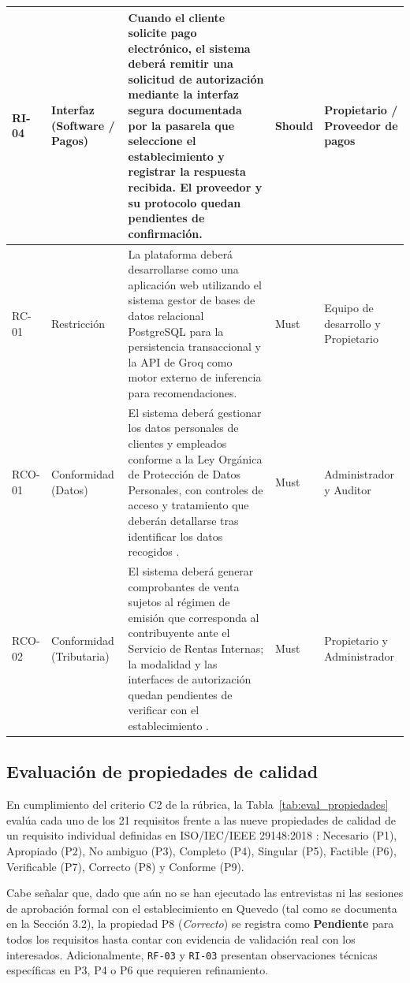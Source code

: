 \documentclass[onecolumn,12pt,a4paper]{IEEEtran}
\begin{document}
\begin{longtable}{>{\raggedright\arraybackslash}p{1.4cm} >{\raggedright\arraybackslash}p{2.3cm} >{\raggedright\arraybackslash}p{7.6cm} >{\raggedright\arraybackslash}p{1.6cm} >{\raggedright\arraybackslash}p{2.3cm}}
        \midrule
        RI-04 & Interfaz (Software / Pagos) & Cuando el cliente solicite pago electr\'onico, el sistema deber\'a remitir una solicitud de autorizaci\'on mediante la interfaz segura documentada por la pasarela que seleccione el establecimiento y registrar la respuesta recibida. El proveedor y su protocolo quedan pendientes de confirmaci\'on. & Should & Propietario / Proveedor de pagos \\
		\midrule
		RC-01 & Restricci\'on & La plataforma deber\'a desarrollarse como una aplicaci\'on web utilizando el sistema gestor de bases de datos relacional PostgreSQL para la persistencia transaccional y la API de Groq como motor externo de inferencia para recomendaciones. & Must & Equipo de desarrollo y Propietario \\
		\midrule
		RCO-01 & Conformidad (Datos) & El sistema deber\'a gestionar los datos personales de clientes y empleados conforme a la Ley Org\'anica de Protecci\'on de Datos Personales, con controles de acceso y tratamiento que deber\'an detallarse tras identificar los datos recogidos \cite{ecuador_lopdp2021}. & Must & Administrador y Auditor \\
        \midrule
        RCO-02 & Conformidad (Tributaria) & El sistema deber\'a generar comprobantes de venta sujetos al r\'egimen de emisi\'on que corresponda al contribuyente ante el Servicio de Rentas Internas; la modalidad y las interfaces de autorizaci\'on quedan pendientes de verificar con el establecimiento \cite{sri_comprobantes}. & Must & Propietario y Administrador \\
	\end{longtable}

	\subsection{Evaluaci\'on de propiedades de calidad}

	En cumplimiento del criterio C2 de la r\'ubrica, la Tabla~\ref{tab:eval_propiedades} eval\'ua cada uno de los 21 requisitos frente a las nueve propiedades de calidad de un requisito individual definidas en ISO/IEC/IEEE 29148:2018 \cite{iso29148}: Necesario (P1), Apropiado (P2), No ambiguo (P3), Completo (P4), Singular (P5), Factible (P6), Verificable (P7), Correcto (P8) y Conforme (P9).

	Cabe se\~nalar que, dado que a\'un no se han ejecutado las entrevistas ni las sesiones de aprobaci\'on formal con el establecimiento en Quevedo (tal como se documenta en la Secci\'on 3.2), la propiedad P8 (\textit{Correcto}) se registra como \textbf{Pendiente} para todos los requisitos hasta contar con evidencia de validaci\'on real con los interesados. Adicionalmente, \texttt{RF-03} y \texttt{RI-03} presentan observaciones t\'ecnicas espec\'ificas en P3, P4 o P6 que requieren refinamiento.
\end{document}
